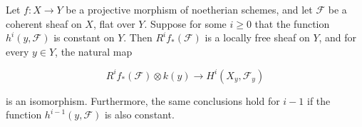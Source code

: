 Let $f: X \to Y$ be a projective morphism of noetherian schemes, and let $\mathcal{F}$ be a coherent sheaf on $X$, flat over $Y$. Suppose for some $i \geq 0$ that the function $h^i(y, \mathcal{F})$ is constant on $Y$. Then $R^i f_*(\mathcal{F})$ is a locally free sheaf on $Y$, and for every $y \in Y$, the natural map

$$R^i f_*(\mathcal{F}) \otimes k(y) \to H^i(X_y, \mathcal{F}_y)$$

is an isomorphism. Furthermore, the same conclusions hold for $i-1$ if the function $h^{i-1}(y, \mathcal{F})$ is also constant.

